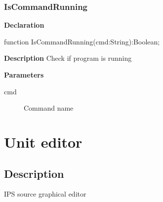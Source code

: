 \documentclass{report}
\newif\ifpdf
\begin{document}
\subsection*{IsCommandRunning}
\fi
\label{distri-IsCommandRunning}
\begin{list}{}{
\setlength{\itemindent}{0cm}
\setlength{\listparindent}{0cm}
\setlength{\leftmargin}{\evensidemargin}
\addtolength{\leftmargin}{\tmplength}
\settowidth{\labelsep}{X}
\addtolength{\leftmargin}{\labelsep}
\setlength{\labelwidth}{\tmplength}
}
\item[\textbf{Declaration}\hfill]
\ifpdf
\begin{flushleft}
\fi
\begin{ttfamily}
function IsCommandRunning(cmd:String):Boolean;\end{ttfamily}

\ifpdf
\end{flushleft}
\fi

\par
\item[\textbf{Description}]
Check if program is running \par
\item[\textbf{Parameters}]
\begin{description}
\item[cmd] Command name
\end{description}


\end{list}
\chapter{Unit editor}
\label{editor}
\section{Description}
IPS source graphical editor
\end{document}
